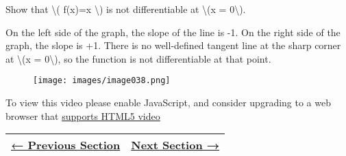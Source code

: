 Show that \textbackslash{}( f(x)=\textbar{}x\textbar{} \textbackslash{})
is not differentiable at \textbackslash{}(x = 0\textbackslash{}).

On the left side of the graph, the slope of the line is -1. On the right
side of the graph, the slope is +1. There is no well-defined tangent
line at the sharp corner at \textbackslash{}(x = 0\textbackslash{}), so
the function is not differentiable at that point.

\begin{figure}
\centering
\texttt{[image: images/image038.png]}
\caption{}
\end{figure}

To view this video please enable JavaScript, and consider upgrading to a
web browser that \href{http://videojs.com/html5-video-support/}{supports
HTML5 video}

\begin{longtable}[]{@{}ll@{}}
\toprule
\endhead
\href{section2-4.php}{← Previous Section} & \href{section2-6.php}{Next
Section →}\tabularnewline
\bottomrule
\end{longtable}
